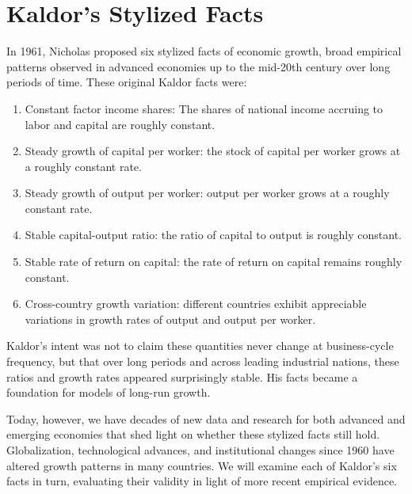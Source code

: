 \documentclass[\topdir/lecture\_notes.tex]{subfiles}
\begin{document}
\section{Kaldor's Stylized Facts}
\label{sec:kaldor-overview}


In 1961, Nicholas \textcite{kaldor1961capital} proposed six stylized facts of economic growth, broad empirical patterns observed in advanced economies up to the mid-20th century over long periods of time.
These original Kaldor facts were:
\begin{enumerate}
  \item Constant factor income shares: The shares of national income accruing to labor and capital are roughly constant.
  \item Steady growth of capital per worker: the stock of capital per worker grows at a roughly constant rate.
  \item Steady growth of output per worker: output per worker grows at a roughly constant rate.
  \item Stable capital-output ratio: the ratio of capital to output is roughly constant.
  \item Stable rate of return on capital: the rate of return on capital remains roughly constant.
  \item Cross-country growth variation: different countries exhibit appreciable variations in growth rates of output and output per worker.
\end{enumerate}
Kaldor's intent was not to claim these quantities never change at business-cycle frequency, but that over long periods and across leading industrial nations, these ratios and growth rates appeared surprisingly stable.
His facts became a foundation for models of long-run growth.

Today, however, we have decades of new data and research for both advanced and emerging economies that shed light on whether these stylized facts still hold.
Globalization, technological advances, and institutional changes since 1960 have altered growth patterns in many countries.
We will examine each of Kaldor's six facts in turn, evaluating their validity in light of more recent empirical evidence.

\end{document}
